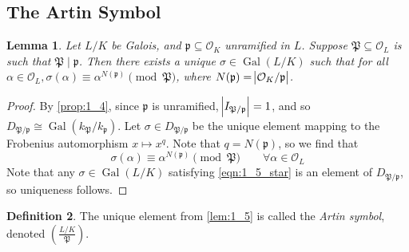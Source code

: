 \documentclass[11pt]{article}
\theoremstyle{definition}
\newtheorem{definition}{Definition}[section]
\theoremstyle{plain}
\newtheorem{lemma}[definition]{Lemma}
\theoremstyle{remark}
\DeclareMathOperator{\Gal}{Gal}
\newcommand{\cO}{\mathcal{O}}
\newcommand{\cp}{\mathfrak{P}}
\newcommand{\fp}{\mathfrak{p}}
\newcommand{\leg}[2]{\left(\frac{#1}{#2}\right)}
\begin{document}
\subsection{The Artin Symbol}

\begin{lemma}\label{lem:1_5}
    Let $L/K$ be Galois, and $\fp \subseteq \cO_K$ unramified in $L$. Suppose $\cp \subseteq \cO_L$ is such that $\cp \mid \fp$. Then there exists a unique $\sigma \in \Gal(L/K)$ such that for all $\alpha \in \cO_L, \sigma(\alpha) \equiv \alpha^{N(\fp)} \pmod{\cp}$, where $N(\fp) = \abs{\cO_K / \fp}$.
\end{lemma}
\begin{proof}
    By \autoref{prop:1_4}, since $\fp$ is unramified, $\abs{I_{\cp / \fp}} = 1$, and so $D_{\cp / \fp} \cong \Gal(k_\cp / k_\fp)$. Let $\sigma \in D_{\cp / \fp}$ be the unique element mapping to the Frobenius automorphism $x \mapsto x^q$. Note that $q = N(\fp)$, so we find that
    \begin{equation}\label{eqn:1_5_star}
        \sigma(\alpha) \equiv \alpha^{N(\fp)} \pmod{\cp} \qquad \forall \alpha \in \cO_L
    \end{equation}
    Note that any $\sigma \in \Gal(L/K)$ satisfying \eqref{eqn:1_5_star} is an element of $D_{\cp / \fp}$, so uniqueness follows.
\end{proof}

\begin{definition}\label{def:1_6}
    The unique element from \autoref{lem:1_5} is called the \emph{Artin symbol}, denoted $\leg{L/K}{\cp}$.
\end{definition}
\end{document}
